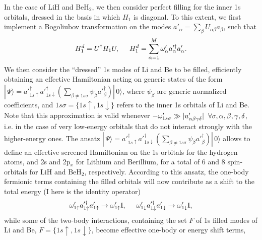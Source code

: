 \documentclass[twocolumn]{revtex4-1}
\newcommand{\be}{\begin{equation}}
\newcommand{\ee}{\end{equation}}
\newcommand{\1}{\mathbbm{1}}
\newcommand{\ket}[1]{ | \, #1 \rangle}
\begin{document}
In the case of LiH and BeH$_2$, we then consider perfect filling for the inner 1s orbitals, dressed in the basis in which $H_1$ is diagonal. To this extent, we first implement a Bogoliubov transformation on the modes $a'_\alpha=\sum_\beta U_{\alpha\beta}a_\beta $, such that 
\begin{equation}
H_1^d=U^\dag H_1U,\hspace{0.5cm}H^d_1=\sum_{\alpha=1}^M \omega'_\alpha a'^\dag_\alpha a'_\alpha.
\end{equation}
We then consider the ``dressed'' 1s modes of Li and Be to be filled, efficiently obtaining an effective Hamiltonian acting on generic states of the form $\ket{\Psi}=a'^\dag_{1s\uparrow}a'^\dag_{1s\downarrow}\left(\sum_{\beta\neq1s\sigma}\psi_\beta a'^\dag_{\beta}\right)\ket{0}$, where $\psi_\beta$ are generic normalized coefficients, and $1s\sigma=\{1s\uparrow,1s\downarrow\}$ refers to the inner 1s orbitals of Li and Be. Note that this approximation is valid whenever $-\omega'_{1s\sigma}\gg |u'_{\alpha\beta\gamma\delta}|\hspace{0.2cm}\forall\sigma,\alpha,\beta,\gamma,\delta$, i.e. in the case of very low-energy orbitals that do not interact strongly with the higher-energy ones. The ansatz $\ket{\Psi}=a'^\dag_{1s\uparrow}a'^\dag_{1s\downarrow}\left(\sum_{\beta\neq1s\sigma}\psi_\beta a'^\dag_{\beta}\right)\ket{0}$ allows to define an effective screened Hamiltonian on the 1s orbitals for the hydrogen atoms, and 2s and 2p$_x$ for Lithium and Berillium, for a total of 6 and 8 spin-orbitals for LiH and BeH$_2$, respectively. According to this ansatz, the one-body fermionic terms containing the filled orbitals will now contribute as a shift to the total energy (I here is the identity operator)
\be
\omega'_{1\uparrow}a'^\dag_{1\uparrow} a'_{1\uparrow} \rightarrow\omega'_{1\uparrow} \textrm{I},\hspace{0.5cm}\omega'_{1\downarrow}a'^\dag_{1\downarrow} a'_{1\downarrow} \rightarrow\omega'_{1\downarrow} \textrm{I},
\ee
while some of the two-body interactions, containing the set $F$ of 1s filled modes of Li and Be, $F=\{1s\uparrow,1s\downarrow\}$, become effective one-body or energy shift terms,
\end{document}
